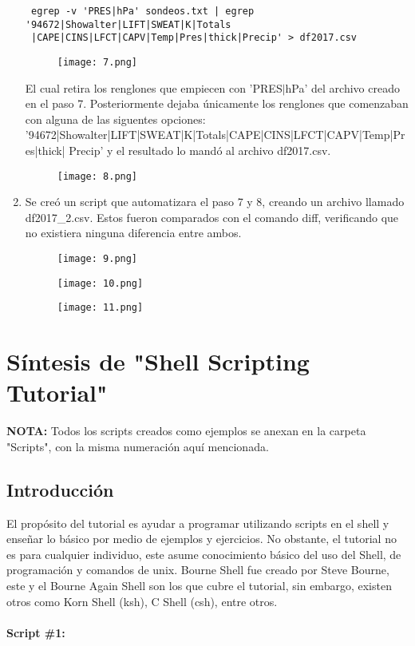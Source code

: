 \documentclass[a4paper]{article}
\begin{document}
\begin{enumerate}
\begin{verbatim}
 egrep -v 'PRES|hPa' sondeos.txt | egrep '94672|Showalter|LIFT|SWEAT|K|Totals
 |CAPE|CINS|LFCT|CAPV|Temp|Pres|thick|Precip' > df2017.csv
 \end{verbatim}
 \begin{figure}[h!]
  \texttt{[image: 7.png]}
  \centering
  \label{fig:7}
\end{figure}
El cual retira los renglones que empiecen con 'PRES$|$hPa' del archivo creado en el paso 7. Posteriormente dejaba únicamente los renglones que comenzaban con alguna de las siguentes opciones: '94672|Showalter|LIFT|SWEAT|K|Totals|CAPE|CINS|LFCT|CAPV|Temp|Pres|thick| Precip' y el resultado lo mandó al archivo df2017.csv.
\begin{figure}[h!]
  \texttt{[image: 8.png]}
  \centering
  \label{fig:8}
\end{figure}
 \item Se creó un script que automatizara el paso 7 y 8, creando un archivo llamado df2017\_2.csv. Estos fueron comparados con el comando diff, verificando que no existiera ninguna diferencia entre ambos.
 \begin{figure}[h!]
  \texttt{[image: 9.png]}
  \centering
  \label{fig:9}
\end{figure}
\begin{figure}[h!]
  \texttt{[image: 10.png]}
  \centering
  \label{fig:10}
\end{figure}
\begin{figure}[h!]
  \texttt{[image: 11.png]}
  \centering
  \label{fig:11}
\end{figure}
\end{enumerate}


\section{Síntesis de "Shell Scripting Tutorial"}

\textbf{NOTA:} Todos los scripts creados como ejemplos se anexan en la carpeta "Scripts", con la misma numeración aquí mencionada. 

\subsection{Introducción}
El propósito del tutorial es ayudar a programar utilizando scripts en el shell y enseñar lo básico por medio de ejemplos y ejercicios. No obstante, el tutorial no es para cualquier individuo, este asume conocimiento básico del uso del Shell, de programación y comandos de unix. 
Bourne Shell fue creado por Steve Bourne, este y el Bourne Again Shell son los que cubre el tutorial, sin embargo, existen otros como Korn Shell (ksh), C Shell (csh), entre otros.\\
\\
\textbf{Script \#1:} 
\end{document}
